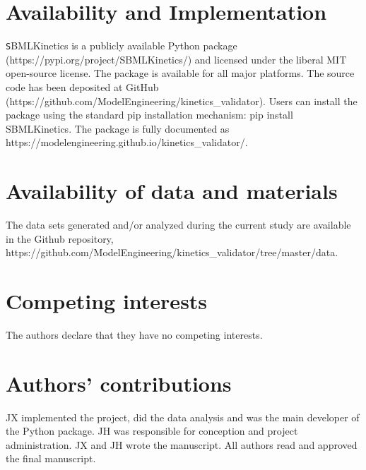 \documentclass{bmcart}
\begin{document}
\begin{backmatter}
\section*{Availability and Implementation}%
{\texttt SBMLKinetics} is a publicly available Python package (https://pypi.org/project/SBMLKinetics/) and licensed under the liberal MIT open-source license. The package is available for all major platforms. The source code has been deposited at GitHub (https://github.com/ModelEngineering/kinetics\_validator). Users can install the package using the standard pip installation mechanism: pip install SBMLKinetics. The package is fully documented as https://modelengineering.github.io/kinetics\_validator/. 

\section*{Availability of data and materials}%
The data sets generated and/or analyzed during the current study are available in the Github repository, https://github.com/ModelEngineering/kinetics\_validator/tree/master/data.

\section*{Competing interests}
The authors declare that they have no competing interests.


\section*{Authors' contributions}
JX implemented the project, did the data analysis and was the main developer of the Python package. JH was responsible for conception and project administration. JX and JH wrote the manuscript. All authors read and approved the final manuscript.



\end{backmatter}
\end{document}
